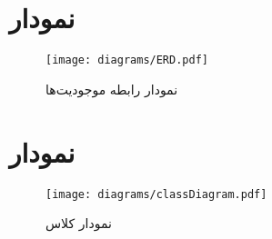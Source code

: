 \documentclass[a4paper,12pt]{report}
\begin{document}
	\pagebreak
	\section{
		نمودار 
		}\label{sec2:chap2}
	\begin{figure}[!h]
		\label{fig1:sec2:chap2}
		\begin{center}
			\texttt{[image: diagrams/ERD.pdf]}
			\caption{نمودار رابطه موجودیت‌ها}
		\end{center}
	\end{figure}


	\section{
		نمودار 
		}\label{sec3:chap2}

	\begin{figure}[!h]
		\label{fig1:sec3:chap2}
		\begin{center}
			\texttt{[image: diagrams/classDiagram.pdf]}
			\caption{نمودار کلاس}
		\end{center}
	\end{figure}
\end{document}
